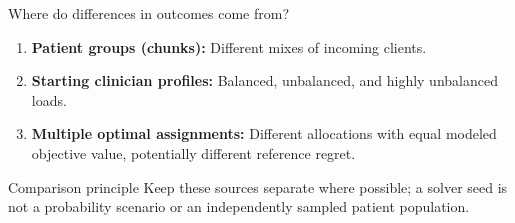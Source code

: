 \documentclass[aspectratio=169,11pt]{beamer}
\newcommand{\key}[1]{\textcolor{deepblue}{\textbf{#1}}}
\begin{document}
\begin{frame}{Where do differences in outcomes come from?}

\begin{enumerate}
\setlength{\itemsep}{12pt}

\item \key{Patient groups (chunks):} Different mixes of incoming clients.

\item \key{Starting clinician profiles:} Balanced, unbalanced, and highly unbalanced loads.

\item \key{Multiple optimal assignments:} Different allocations with equal modeled objective value, potentially different reference regret.

\end{enumerate}

\begin{block}{Comparison principle}
Keep these sources separate where possible; a solver seed is not a probability scenario or an independently sampled patient population.
\end{block}

\end{frame}
\end{document}
